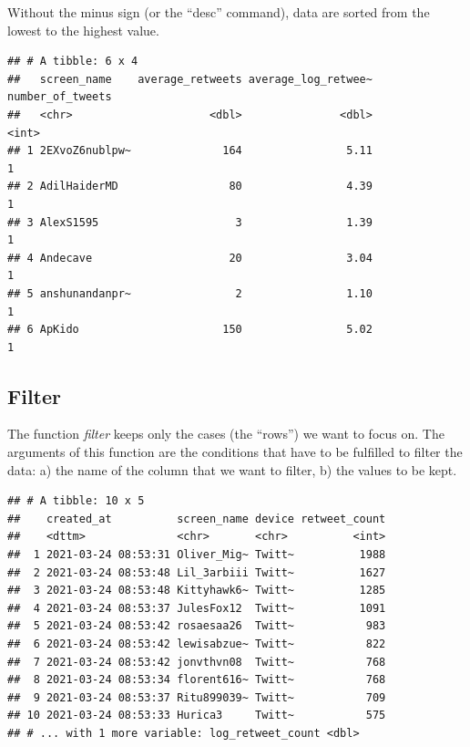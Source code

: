 \documentclass[
]{article}
\newenvironment{Shaded}{\begin{snugshade}}{\end{snugshade}}
\newcommand{\DecValTok}[1]{\textcolor[rgb]{0.00,0.00,0.81}{#1}}
\newcommand{\KeywordTok}[1]{\textcolor[rgb]{0.13,0.29,0.53}{\textbf{#1}}}
\newcommand{\NormalTok}[1]{#1}
\newcommand{\OperatorTok}[1]{\textcolor[rgb]{0.81,0.36,0.00}{\textbf{#1}}}
\newcommand{\StringTok}[1]{\textcolor[rgb]{0.31,0.60,0.02}{#1}}
\begin{document}
Without the minus sign (or the ``desc'' command), data are sorted from the lowest to the highest value.

\begin{Shaded}
\end{Shaded}

\begin{verbatim}
## # A tibble: 6 x 4
##   screen_name    average_retweets average_log_retwee~ number_of_tweets
##   <chr>                     <dbl>               <dbl>            <int>
## 1 2EXvoZ6nublpw~              164                5.11                1
## 2 AdilHaiderMD                 80                4.39                1
## 3 AlexS1595                     3                1.39                1
## 4 Andecave                     20                3.04                1
## 5 anshunandanpr~                2                1.10                1
## 6 ApKido                      150                5.02                1
\end{verbatim}

\hypertarget{filter}{%
\subsection{Filter}\label{filter}}

The function \emph{filter} keeps only the cases (the ``rows'') we want to focus on. The arguments of this function are the conditions that have to be fulfilled to filter the data: a) the name of the column that we want to filter, b) the values to be kept.

\begin{Shaded}
\end{Shaded}

\begin{verbatim}
## # A tibble: 10 x 5
##    created_at          screen_name device retweet_count
##    <dttm>              <chr>       <chr>          <int>
##  1 2021-03-24 08:53:31 Oliver_Mig~ Twitt~          1988
##  2 2021-03-24 08:53:48 Lil_3arbiii Twitt~          1627
##  3 2021-03-24 08:53:48 Kittyhawk6~ Twitt~          1285
##  4 2021-03-24 08:53:37 JulesFox12  Twitt~          1091
##  5 2021-03-24 08:53:42 rosaesaa26  Twitt~           983
##  6 2021-03-24 08:53:42 lewisabzue~ Twitt~           822
##  7 2021-03-24 08:53:42 jonvthvn08  Twitt~           768
##  8 2021-03-24 08:53:34 florent616~ Twitt~           768
##  9 2021-03-24 08:53:37 Ritu899039~ Twitt~           709
## 10 2021-03-24 08:53:33 Hurica3     Twitt~           575
## # ... with 1 more variable: log_retweet_count <dbl>
\end{verbatim}
\end{document}
